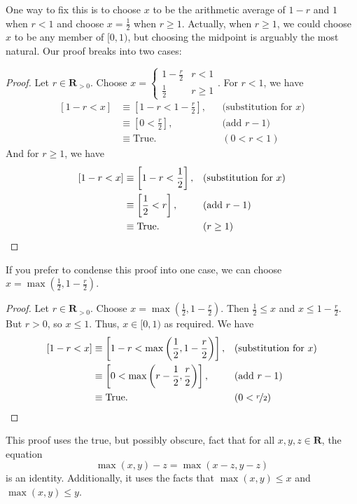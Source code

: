 \documentclass[12pt,fleqn]{article}
\newcommand{\reals}{\mathbf{R}}
\newcommand{\true}{\mathrm{True}}
\newenvironment{myproof}
  {\begin{shaded}\begin{proof}}
  {\end{proof}\end{shaded}}
\newcounter{ex}\setcounter{ex}{0}
\begin{document}
One way to fix this is to choose $x$ to be the arithmetic average of $1-r$ and $1$ when $r < 1$ and choose $x = \frac{1}{2}$ when $r \geq 1$. 
Actually, when $r \geq 1$, we could choose $x$ to be any member of $[0,1)$, but choosing the midpoint is arguably the most natural.
Our proof breaks into two cases:
     
      \begin{myproof} Let $r \in \reals_{>0}$. Choose $x = \begin{cases} 1 - \frac{r}{2}  & r < 1 \\ \frac{1}{2} & r \geq 1 \end{cases}$. For $r < 1$, we have
      \begin{align*}
       \left[1-r < x \right] &\equiv \left[1-r < 1 - \frac{r}{2}  \right], && \text{(substitution for $x$)} \\
                                  &\equiv  \left[0 <  \frac{r}{2}  \right], && \text{(add $r-1$)} \\
                                  &\equiv \true.   &&(0 < r < 1)
      \end{align*}
      And for $r \geq 1$, we have
       \begin{align*}
       \left[1-r < x \right] &\equiv \left[1-r < \frac{1}{2}  \right], && \text{(substitution for $x$)} \\
                                  &\equiv  \left[\frac{1}{2}  <  r  \right], && \text{(add $r-1$)} \\
                                  &\equiv \true.   &&(r \geq 1) \qedhere
      \end{align*}
      \end{myproof}
 If you prefer to condense this proof into one case, we can choose  $x = \max(\frac{1}{2}, 1-\frac{r}{2})$. 
 
     \begin{myproof} Let $r \in \reals_{>0}$. Choose $x = \max(\frac{1}{2}, 1-\frac{r}{2})$.  Then
     $\frac{1}{2} \leq x$ and  $x  \leq 1-\frac{r}{2}$. But $ r > 0$, so $x \leq 1$. Thus, $x \in [0,1)$ as required. We have     
      \begin{align*}
       \left[1-r < x \right] &\equiv \left[1-r <  \max \left(\frac{1}{2}, 1-\frac{r}{2} \right)  \right], && \text{(substitution for $x$)} \\
                                 &\equiv  \left[0 <  \max \left (r - \frac{1}{2}, \frac{r}{2} \right)  \right], && \text{(add $r-1$)} \\
                                  &\equiv \true.   &&(0 < \nicefrac{r}{2}) \qedhere
      \end{align*}
 \end{myproof}
 \noindent This proof uses the true, but possibly obscure, fact that for all $x,y,z \in \reals$, the equation 
 \begin{equation*}
    \max(x,y) - z = \max(x-z, y-z)
\end{equation*}
 is an identity.  Additionally, it uses the facts that $\max(x,y) \leq x$ and $\max(x,y) \leq y$.
 
\end{document}
